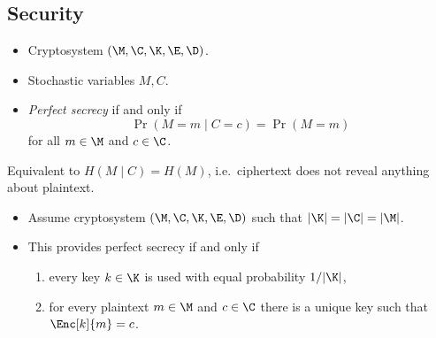 \subsection{Security}

\begin{frame}
  \begin{definition}
    \begin{itemize}
      \item Cryptosystem \((\M, \C, \K, \E, \D)\).
      \item Stochastic variables \(M, C\).
      \item \emph{Perfect secrecy} if and only if \[\Pr(M = m\mid C = c) 
          = \Pr(M = m)\] for all \(m\in \M\) and \(c\in \C\).
    \end{itemize}
  \end{definition}

  \pause{}

  \begin{remark}
    Equivalent to \(H(M\mid C) = H(M)\), i.e.\ ciphertext does not reveal 
    anything about plaintext.
  \end{remark}
\end{frame}

\begin{frame}
  \begin{theorem}
    \begin{itemize}
      \item Assume cryptosystem \((\M, \C, \K, \E, \D)\) such that \(|\K| 
          = |\C| = |\M|\).

        \pause{}

      \item This provides perfect secrecy if and only if
        \begin{enumerate}
          \item every key \(k\in \K\) is used with equal probability 
            \(1/|\K|\),
          \item for every plaintext \(m\in \M\) and \(c\in \C\) there is 
            a unique key such that \(\Enc[k]{m} = c\).
        \end{enumerate}
    \end{itemize}
  \end{theorem}
\end{frame}

